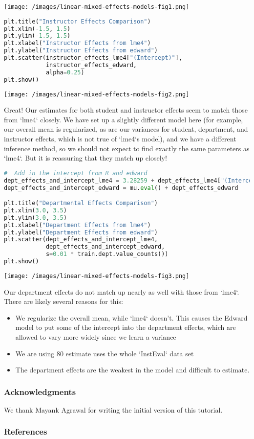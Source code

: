 \texttt{[image: /images/linear-mixed-effects-models-fig1.png]}

\begin{lstlisting}[language=Python]
plt.title("Instructor Effects Comparison")
plt.xlim(-1.5, 1.5)
plt.ylim(-1.5, 1.5)
plt.xlabel("Instructor Effects from lme4")
plt.ylabel("Instructor Effects from edward")
plt.scatter(instructor_effects_lme4["(Intercept)"],
            instructor_effects_edward,
            alpha=0.25)
plt.show()
\end{lstlisting}

\texttt{[image: /images/linear-mixed-effects-models-fig2.png]}

Great!  Our estimates for both student and instructor effects seem to
match those from `lme4` closely.  We have set up a slightly different
model here (for example, our overall mean is regularized, as are our
variances for student, department, and instructor effects, which is not
true of `lme4`s model), and we have a different inference method, so we
should not expect to find exactly the same parameters as `lme4`.  But
it is reassuring that they match up closely!

\begin{lstlisting}[language=Python]
#  Add in the intercept from R and edward
dept_effects_and_intercept_lme4 = 3.28259 + dept_effects_lme4["(Intercept)"]
dept_effects_and_intercept_edward = mu.eval() + dept_effects_edward

plt.title("Departmental Effects Comparison")
plt.xlim(3.0, 3.5)
plt.ylim(3.0, 3.5)
plt.xlabel("Department Effects from lme4")
plt.ylabel("Department Effects from edward")
plt.scatter(dept_effects_and_intercept_lme4,
            dept_effects_and_intercept_edward,
            s=0.01 * train.dept.value_counts())
plt.show()
\end{lstlisting}

\texttt{[image: /images/linear-mixed-effects-models-fig3.png]}

Our department effects do not match up nearly as well with those from `lme4`.
There are likely several reasons for this:

\begin{itemize}
\item
  We regularize the overall mean, while `lme4` doesn't. This causes the
  Edward model to put some of the intercept into the department effects,
  which are allowed to vary more widely since we learn a variance
\item
  We are using 80%
  estimate uses the whole `InstEval` data set
\item
  The department effects are the weakest in the model and difficult to
  estimate.
\end{itemize}

\subsubsection{Acknowledgments}

We thank Mayank Agrawal for writing the initial version of this
tutorial.

\subsubsection{References}\label{references}
